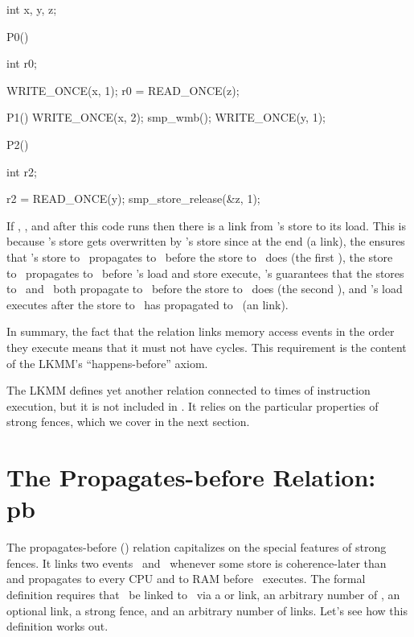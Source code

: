 \begin{VerbatimU}
	int x, y, z;

	P0()
	{
		int r0;

		WRITE_ONCE(x, 1);
		r0 = READ_ONCE(z);
	}

	P1()
	{
		WRITE_ONCE(x, 2);
		smp_wmb();
		WRITE_ONCE(y, 1);
	}

	P2()
	{
		int r2;

		r2 = READ_ONCE(y);
		smp_store_release(&z, 1);
	}
\end{VerbatimU}

If , , and  after this code runs
then there is a  link from 's store to its load.
This is because 's store gets overwritten by 's store
since  at the end (a  link), the 
ensures that 's store to~ propagates to~ before the
store to~ does (the first ), the store to~
propagates to~ before 's load and store execute,
's  guarantees that the stores to~
and~ both propagate to~ before the store to~ does
(the second ), and 's load executes after the
store to~ has propagated to~ (an  link).

In summary, the fact that the  relation links memory access events
in the order they execute means that it must not have cycles.
This requirement is the content of the LKMM's ``happens-before'' axiom.

The LKMM defines yet another relation connected to times of
instruction execution, but it is not included in .
It relies on the particular properties of strong fences, which we
cover in the next section.


\section{The Propagates-before Relation: pb}
\label{sec:docs:explanation:The Propagates-before Relation: pb}

The propagates-before () relation capitalizes on the special
features of strong fences.
It links two events~ and~ whenever some store is
coherence-later than~ and propagates to every CPU and to RAM
before ~executes.
The formal definition requires that ~be linked to~
via a  or  link, an arbitrary number of
, an optional  link, a strong fence, and
an arbitrary number of  links.
Let's see how this definition works out.

